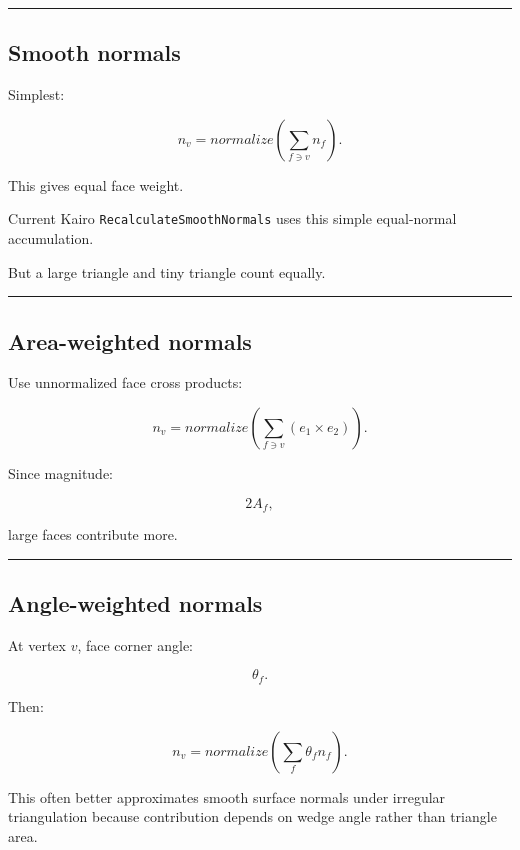 \begin{center}\rule{0.5\linewidth}{0.5pt}\end{center}

\subsection{Smooth normals}\label{04-visual-computing-ii-ch041-smooth-normals}

Simplest:

\[
n_v=
normalize
\left(
\sum_{f\ni v}
n_f
\right).
\]

This gives equal face weight.

Current Kairo \texttt{RecalculateSmoothNormals} uses this simple equal-normal accumulation.

But a large triangle and tiny triangle count equally.

\begin{center}\rule{0.5\linewidth}{0.5pt}\end{center}

\subsection{Area-weighted normals}\label{04-visual-computing-ii-ch041-area-weighted-normals}

Use unnormalized face cross products:

\[
\boxed{
n_v
=
normalize
\left(
\sum_{f\ni v}
(e_1\times e_2)
\right).
}
\]

Since magnitude:

\[
2A_f,
\]

large faces contribute more.

\begin{center}\rule{0.5\linewidth}{0.5pt}\end{center}

\subsection{Angle-weighted normals}\label{04-visual-computing-ii-ch041-angle-weighted-normals}

At vertex \(v\), face corner angle:

\[
\theta_f.
\]

Then:

\[
\boxed{
n_v=
normalize
\left(
\sum_f
\theta_fn_f
\right).
}
\]

This often better approximates smooth surface normals under irregular triangulation because contribution depends on wedge angle rather than triangle area.

